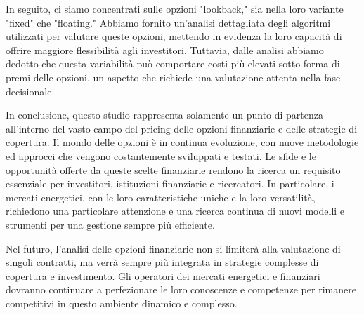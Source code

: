 \documentclass[12pt,a4paper]{report}
\begin{document}
In seguito, ci siamo concentrati sulle opzioni "lookback," sia nella loro variante "fixed" che "floating." Abbiamo fornito un'analisi dettagliata degli algoritmi utilizzati per valutare queste opzioni, mettendo in evidenza la loro capacità di offrire maggiore flessibilità agli investitori. Tuttavia, dalle analisi abbiamo dedotto che questa variabilità può comportare costi più elevati sotto forma di premi delle opzioni, un aspetto che richiede una valutazione attenta nella fase decisionale.

In conclusione, questo studio rappresenta solamente un punto di partenza all'interno del vasto campo del pricing delle opzioni finanziarie e delle strategie di copertura. Il mondo delle opzioni è in continua evoluzione, con nuove metodologie ed approcci che vengono costantemente sviluppati e testati. Le sfide e le opportunità offerte da queste scelte finanziarie rendono la ricerca un requisito essenziale per investitori, istituzioni finanziarie e ricercatori. In particolare, i mercati energetici, con le loro caratteristiche uniche e la loro versatilità, richiedono una particolare attenzione e una ricerca continua di nuovi modelli e strumenti per una gestione sempre più efficiente.

Nel futuro, l'analisi delle opzioni finanziarie non si limiterà alla valutazione di singoli contratti, ma verrà sempre più integrata in strategie complesse di copertura e investimento. Gli operatori dei mercati energetici e finanziari dovranno continuare a perfezionare le loro conoscenze e competenze per rimanere competitivi in questo ambiente dinamico e complesso.
\end{document}
